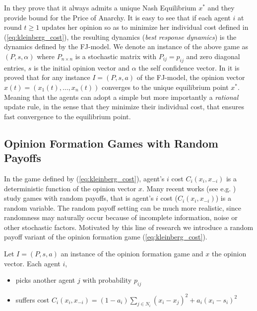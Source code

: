 \noindent In \cite{BK011} they prove that it always admits a unique
Nash Equilibrium $x^*$ and they provide bound for the Price of Anarchy.
It is easy to see that if each agent $i$ at round $t \geq 1$ updates her opinion so as to minimize her
individual cost defined in (\ref{eq:kleinberg_cost}), the resulting dynamics (\emph{best response dynamics}) 
is the dynamics defined by the FJ-model. We denote an instance of the above game as $(P,s,\alpha)$ where
$P_{n \times n}$ is a stochastic matrix with $P_{ij}=p_{ij}$ and zero diagonal entries, $s$ is the initial 
opinion vector and $\alpha$ the self confidence vector. In \cite{GS14} it is proved that for any instance $I=(P,s,a)$ of the FJ-model, the opinion
vector $x(t)=(x_1(t),\ldots,x_n(t))$ converges to the unique equilibrium point
$x^*$. Meaning that the agents can adopt a simple
but more importantly a \emph{rational} update rule, in the sense that they minimize their individual cost,
that ensures fast convergence to the equilibrium point.

\subsection{Opinion Formation Games with Random Payoffs}
In the game defined by (\ref{eq:kleinberg_cost}),
agent's $i$ cost $C_i(x_i,x_{-i})$ is a deterministic function of the
opinion vector $x$. Many recent works (see e.g. \cite{Zhou17}) study games
with random payoffs, that is agent's $i$ cost ($C_i(x_i,x_{-i})$) is a
random variable. The random payoff setting can be much more realistic,
since randomness may naturally occur because of incomplete information, noise
or other stochastic factors. Motivated by this
line of research we introduce a random payoff variant of the opinion
formation game (\ref{eq:kleinberg_cost}).

\begin{definition}\label{d:random_payoff_game}
  Let $I=(P,s,a)$ an instance of the opinion formation game
  and $x$ the opinion vector. Each agent $i$,
  \begin{itemize}
    \item picks another agent $j$ with probability $p_{ij}$
    \item suffers cost
      $C_i(x_i,x_{-i}) = (1-a_i)\sum_{j \in N_i}(x_i-x_j)^2 + a_i(x_i-s_i)^2$
  \end{itemize}
\end{definition}

